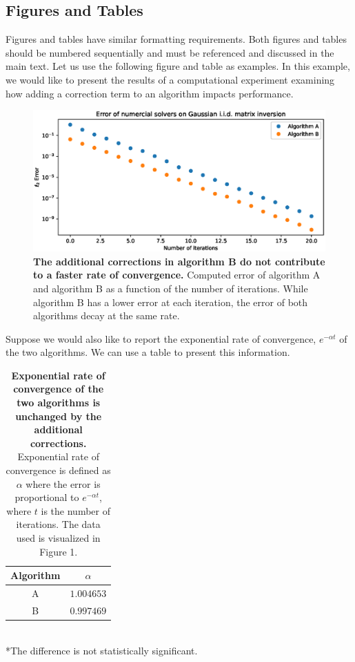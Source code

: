 \documentclass[]{article}
\begin{document}
\pagebreak

\subsection{Figures and Tables}

Figures and tables have similar formatting requirements. Both figures and tables should be numbered sequentially and must be referenced and discussed in the main text.
Let us use the following figure and table as examples. In this example, we would like to present the results of a computational experiment examining how adding a correction term to an algorithm impacts performance.

\begin{figure}[htb!]
    \includegraphics[width=\textwidth]{figure.eps}
    \caption{{\bf The additional corrections in algorithm B do not contribute to a faster rate of convergence.} Computed error of algorithm A and algorithm B as a function of the number of iterations. While algorithm B has a lower error at each iteration, the error of both algorithms decay at the same rate.}
\end{figure}

Suppose we would also like to report the exponential rate of convergence, $e^{-\alpha t}$ of the two algorithms. We can use a table to present this information.


\begin{table}[hb!]
    \centering
    \caption{{\bf Exponential rate of convergence of the two algorithms is unchanged by the additional corrections.} Exponential rate of convergence is defined as $\alpha$ where the error is proportional to $e^{-\alpha t}$, where $t$ is the number of iterations. The data used is visualized in Figure 1.}

    \begin{tabular}{c|c}
        Algorithm & $\alpha$ \\
        \hline
        A & $1.004653$ \\
        B & $0.997469$ \\
    \end{tabular} \\

    *The difference is not statistically significant.
\end{table}
\end{document}
